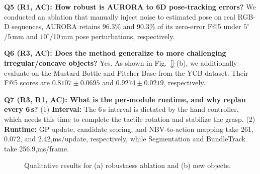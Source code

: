 \documentclass[conference]{IEEEtran}
\begin{document}




\textbf{Q5 (R1, AC): How robust is AURORA to 6D pose-tracking errors?} We conducted an ablation that manually inject noise to estimated pose
on real RGB-D sequences, AURORA retains 96.3\% and 90.3\% of its
zero-error F@5 under $5^\circ$/5\,mm and $10^\circ$/10\,mm pose perturbations,
respectively.


\textbf{Q6 (R3, AC): Does the method generalize to more challenging irregular/concave objects?}
Yes. As shown in Fig.~\ref{}-(b), we additionally evaluate on the Mustard Bottle and Pitcher Base from the YCB dataset. Their F@5 scores are $0.8107{\pm}0.0695$ and $0.9274{\pm}0.0219$, respectively.

\textbf{Q7 (R3, R1, AC): What is the per-module runtime, and why replan every 6\,s?}
(1) \textbf{Interval:} The 6\,s interval is dictated by the hand controller, which needs this time to complete the tactile rotation and stabilize the grasp. (2) \textbf{Runtime:} GP update, candidate scoring, and NBV-to-action mapping take 261, 0.072, and 2.42,ms/update, respectively, while Segmentation and BundleTrack take 256.9,ms/frame.

\begin{figure}[t]
    \centering

    \fbox{\rule{0pt}{1.5cm}\rule{0.20\linewidth}{0pt}}\hfill
    \fbox{\rule{0pt}{1.5cm}\rule{0.20\linewidth}{0pt}}\hfill
    \fbox{\rule{0pt}{1.5cm}\rule{0.20\linewidth}{0pt}}\hfill
    \fbox{\rule{0pt}{1.5cm}\rule{0.20\linewidth}{0pt}}

    \vspace{0.05cm}

    \hfill

    \caption{Qualitative results for (a) robustness ablation and (b) new objects.}
    \label{fig:additional_results}
\vspace{-0.51cm}
\end{figure}
\end{document}
